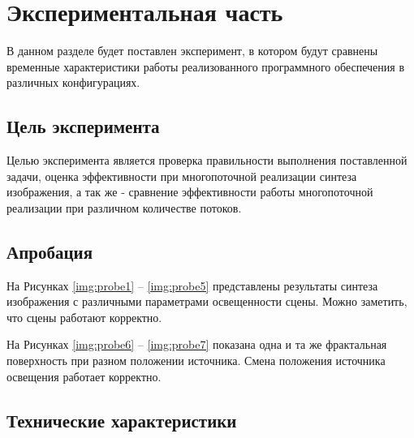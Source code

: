 \chapter{Экспериментальная часть}

В данном разделе будет поставлен эксперимент, в котором будут сравнены временные характеристики работы реализованного программного обеспечения в различных конфигурациях.

\section{Цель эксперимента}

Целью эксперимента является проверка правильности выполнения поставленной задачи, оценка эффективности при многопоточной реализации синтеза изображения, а так же - сравнение эффективности работы многопоточной реализации при различном количестве потоков.

\section{Апробация}

На Рисунках \ref{img:probe1} -- \ref{img:probe5} представлены результаты синтеза изображения с различными параметрами освещенности сцены. Можно заметить, что сцены работают корректно.






\clearpage
На Рисунках \ref{img:probe6} -- \ref{img:probe7} показана одна и та же фрактальная поверхность при разном положении источника. Смена положения источника освещения работает корректно.



\section{Технические характеристики}

